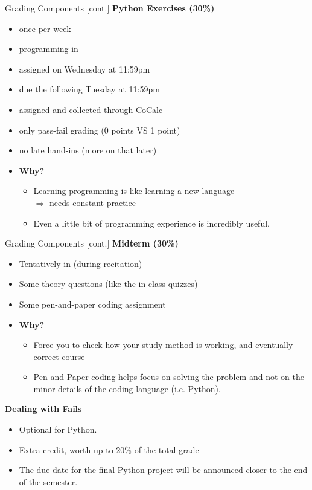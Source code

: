 \documentclass[professionalfonts, xcolor={usenames,svgnames,x11names,table}]{beamer}
\begin{document}
\begin{frame}{Grading Components [cont.]}
    \textbf{Python Exercises (30\%)}
        \begin{itemize}
            \item once per week
            \item programming in 
            \item assigned on Wednesday at 11:59pm
            \item due the following Tuesday at 11:59pm
            \item assigned and collected through CoCalc
            \item only pass-fail grading (0 points VS 1 point)
            \item no late hand-ins (more on that later)
            \item \textbf{Why?}
                \begin{itemize}
                    \item Learning programming is like learning a new language\\
                            $\Rightarrow$ needs constant practice
                    \item Even a little bit of programming experience is incredibly useful.
                \end{itemize}
        \end{itemize}
\end{frame}


\begin{frame}{Grading Components [cont.]}
  \textbf{Midterm (30\%)}
 \begin{itemize}
            \item Tentatively in  (during recitation)
            \item Some theory questions (like the in-class quizzes)
            \item Some pen-and-paper coding assignment        
              \item \textbf{Why?}
                \begin{itemize}
                    \item Force you to check how your study method is working, and eventually correct course
                    \item Pen-and-Paper coding helps focus on solving the problem and not on the minor details of the coding language (i.e. Python).
                \end{itemize}    
            \end{itemize}
            \textbf{Dealing with Fails}
                \begin{itemize}
        \item Optional   for Python.
            \item Extra-credit, worth up to 20\% of the total grade
                            \item The due date for the final Python project will be announced closer to the end of the semester.
    \end{itemize}
\end{frame}
\end{document}
